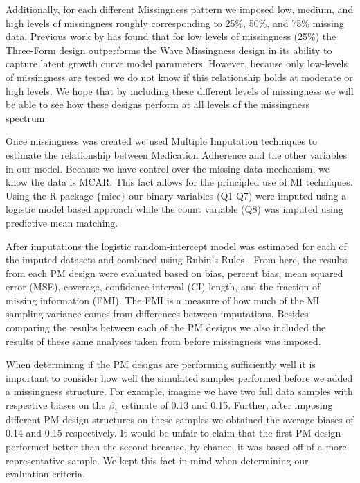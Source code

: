 \documentclass{svjour3}                     %
\begin{document}
Additionally, for each different Missingness pattern we imposed low, medium, and high levels of missingness roughly corresponding to 25\%, 50\%, and 75\% missing data. Previous work by \citet{rhemtulla2014planned} has found that for low levels of missingness (25\%) the Three-Form design outperforms the Wave Missingness design in its ability to capture latent growth curve model parameters. However, because only low-levels of missingness are tested we do not know if this relationship holds at moderate or high levels. We hope that by including these different levels of missingness we will be able to see how these designs perform at all levels of the missingness spectrum. \par
Once missingness was created we used Multiple Imputation techniques to estimate the relationship between Medication Adherence and the other variables in our model. Because we have control over the missing data mechanism, we know the data is MCAR. This fact allows for the principled use of MI techniques. Using the R package $\{$mice$\}$ \citep{mice2011imputation} our binary variables (Q1-Q7) were imputed using a logistic model based approach while the count variable (Q8) was imputed using predictive mean matching. \par

After imputations the logistic random-intercept model was estimated for each of the imputed datasets and combined using Rubin's Rules \citep{rubin2004multiple}. From here, the results from each PM design were evaluated based on bias, percent bias, mean squared error (MSE), coverage, confidence interval (CI) length, and the fraction of missing information (FMI). The FMI is a measure of how much of the MI sampling variance comes from differences between imputations. Besides comparing the results between each of the PM designs we also included the results of these same analyses taken from before missingness was imposed. \par

When determining if the PM designs are performing sufficiently well it is important to consider how well the simulated samples performed before we added a missingness structure. For example, imagine we have two full data samples with respective biases on the $\beta_1$ estimate of 0.13 and 0.15. Further, after imposing different PM design structures on these samples we obtained the average biases of 0.14 and 0.15 respectively. It would be unfair to claim that the first
PM design performed better than the second because, by chance, it was based off of a more representative sample. We kept this fact in mind when determining our evaluation criteria. \par
\end{document}
